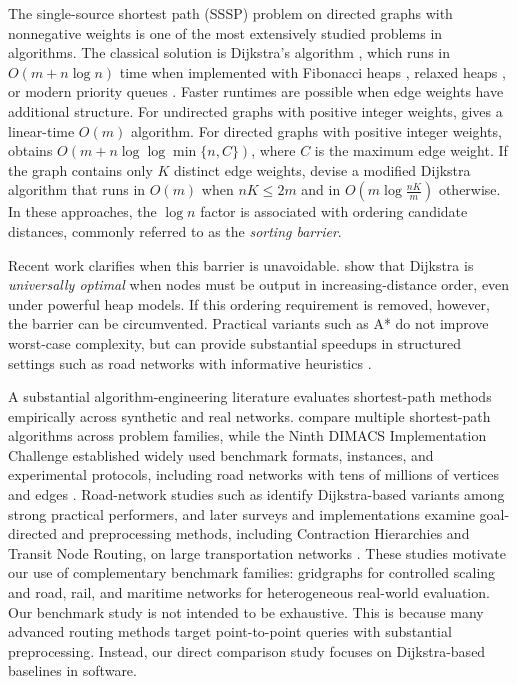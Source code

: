 \documentclass[ijoc,blindrev]{informs3} %
\begin{document}
The single-source shortest path (SSSP) problem on directed graphs with nonnegative weights is one of the most extensively studied problems in algorithms. The classical solution is Dijkstra’s algorithm \citep{dijkstra1959note}, which runs in \(O(m+n\log n)\) time when implemented with Fibonacci heaps \citep{fredman1987fibonacci}, relaxed heaps \citep{driscoll1988relaxed}, or modern priority queues \citep{chen2007priority}. Faster runtimes are possible when edge weights have additional structure. For undirected graphs with positive integer weights, \cite{thorup1999undirected} gives a linear-time \(O(m)\) algorithm. For directed graphs with positive integer weights, \cite{thorup2003integer} obtains \(O(m+n\log\log \min\{n,C\})\), where \(C\) is the maximum edge weight. If the graph contains only \(K\) distinct edge weights, \cite{orlin2010faster} devise a modified Dijkstra algorithm that runs in \(O(m)\) when \(nK\leq2m\) and in \(O\!\left(m\log \tfrac{nK}{m}\right)\) otherwise. In these approaches, the \(\log n\) factor is associated with ordering candidate distances, commonly referred to as the \emph{sorting barrier}.

Recent work clarifies when this barrier is unavoidable. \cite{haeupler2024universal} show that Dijkstra is \emph{universally optimal} when nodes must be output in increasing-distance order, even under powerful heap models. If this ordering requirement is removed, however, the barrier can be circumvented. Practical variants such as A* do not improve worst-case complexity, but can provide substantial speedups in structured settings such as road networks with informative heuristics \citep{hart1968formal}.

{\color{blue}
A substantial algorithm-engineering literature evaluates shortest-path methods empirically across synthetic and real networks. \citet{cherkassky1996shortest} compare multiple shortest-path algorithms across problem families, while the Ninth DIMACS Implementation Challenge established widely used benchmark formats, instances, and experimental protocols, including road networks with tens of millions of vertices and edges \citep{demetrescu2009shortest}. Road-network studies such as \citet{zhan1998shortest} identify Dijkstra-based variants among strong practical performers, and later surveys and implementations examine goal-directed and preprocessing methods, including Contraction Hierarchies and Transit Node Routing, on large transportation networks \citep{sommer2014shortest,bast2016route,makowski2025scgraph}. These studies motivate our use of complementary benchmark families: gridgraphs for controlled scaling and road, rail, and maritime networks for heterogeneous real-world evaluation. Our benchmark study is not intended to be exhaustive. This is because many advanced routing methods target point-to-point queries with substantial preprocessing. Instead, our direct comparison study focuses on Dijkstra-based baselines in software.
}
\end{document}
